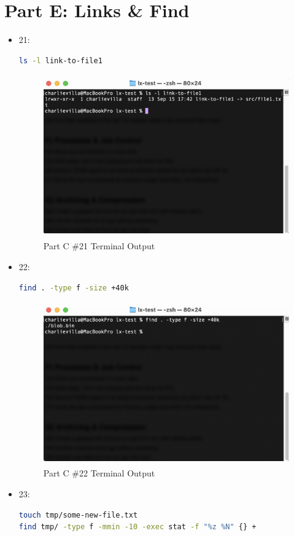 \section{Part E: Links \& Find}
\begin{itemize}
    \item 21: 
    \begin{lstlisting}[language=Bash]
ls -l link-to-file1
    \end{lstlisting}

    \begin{figure}[H]
        \centering
        \includegraphics[width=12cm, height=7cm]{png/LinuxProblemSetPicsPNG/part_e_21.png}
        \caption{Part C \#21 Terminal Output}
        \label{fig:partC 21}
    \end{figure}    
    \item 22: 
    \begin{lstlisting}[language=Bash]
find . -type f -size +40k
    \end{lstlisting}

    \begin{figure}[H]
        \centering
        \includegraphics[width=12cm, height=7cm]{png/LinuxProblemSetPicsPNG/part_e_22.png}
        \caption{Part C \#22 Terminal Output}
        \label{fig:partC 22}
    \end{figure}  
    \item 23: 
    \begin{lstlisting}[language=Bash]
touch tmp/some-new-file.txt
find tmp/ -type f -mmin -10 -exec stat -f "%z %N" {} +
    \end{lstlisting}


\end{itemize}
